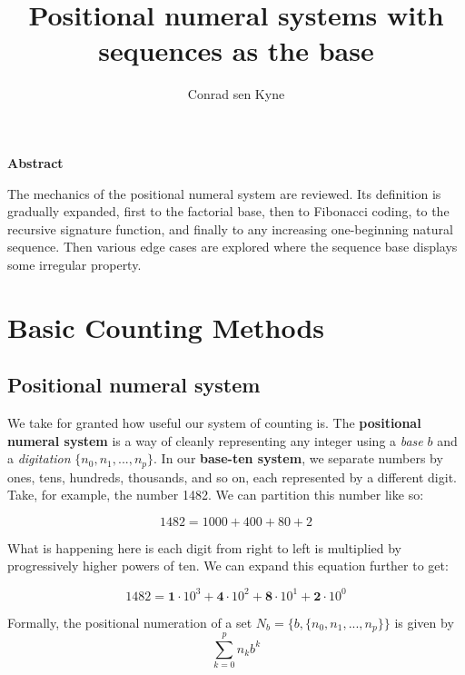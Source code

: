 \documentclass{article}
\title{\Large Positional numeral systems with sequences as the base}
\author{Conrad sen Kyne}
\date{}
\begin{document}
\maketitle

\begin{center}
\textbf{Abstract}
\end{center}

\noindent The mechanics of the positional numeral system are reviewed. Its definition is gradually expanded, first to the factorial base, then to Fibonacci coding, to the recursive signature function, and finally to any increasing one-beginning natural sequence. Then various edge cases are explored where the sequence base displays some irregular property.

\tableofcontents

\pagebreak

\section{Basic Counting Methods}

\subsection{Positional numeral system}

We take for granted how useful our system of counting is. The \textbf{positional numeral system} is a way of cleanly representing any integer using a \textit{base} $b$ and a \textit{digitation} $\{n_0, n_1, ..., n_p\}$. In our \textbf{base-ten system}, we separate numbers by ones, tens, hundreds, thousands, and so on, each represented by a different digit. Take, for example, the number 1482. We can partition this number like so:

\begin{equation}1482 = 1000 + 400 + 80 + 2\end{equation}

\noindent What is happening here is each digit from right to left is multiplied by progressively higher powers of ten. We can expand this equation further to get:

\begin{equation}1482 = \textbf{1} \cdot 10^3 + \textbf{4} \cdot 10^2 + \textbf{8} \cdot 10^1 + \textbf{2} \cdot 10^0\end{equation}

\noindent Formally, the positional numeration of a set $N_b = \{b, \{n_0, n_1, ..., n_p\}\}$ is given by \begin{equation}\sum_{k=0}^{p} n_k b^k\end{equation}
\end{document}
